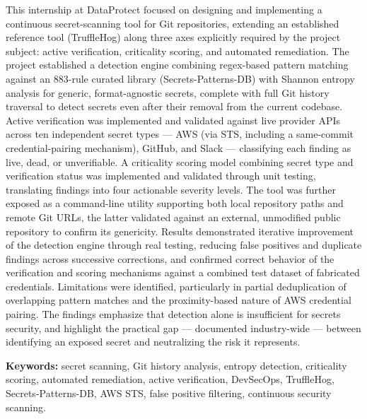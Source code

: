 \documentclass[12pt]{article}
\begin{document}
This internship at DataProtect focused on designing and implementing a
continuous secret-scanning tool for Git repositories, extending an established
reference tool (TruffleHog) along three axes explicitly required by the project
subject: active verification, criticality scoring, and automated remediation.
The project established a detection engine combining regex-based pattern
matching against an 883-rule curated library (Secrets-Patterns-DB) with Shannon
entropy analysis for generic, format-agnostic secrets, complete with full Git
history traversal to detect secrets even after their removal from the current
codebase. Active verification was implemented and validated against live
provider APIs across ten independent secret types --- AWS (via STS, including
a same-commit credential-pairing mechanism), GitHub, and Slack --- classifying
each finding as live, dead, or unverifiable. A criticality scoring model
combining secret type and verification status was implemented and validated
through unit testing, translating findings into four actionable severity
levels. The tool was further exposed as a command-line utility supporting both
local repository paths and remote Git URLs, the latter validated against an
external, unmodified public repository to confirm its genericity. Results
demonstrated iterative improvement of the detection engine through real
testing, reducing false positives and duplicate findings across successive
corrections, and confirmed correct behavior of the verification and scoring
mechanisms against a combined test dataset of fabricated credentials.
Limitations were identified, particularly in partial deduplication of
overlapping pattern matches and the proximity-based nature of AWS credential
pairing. The findings emphasize that detection alone is insufficient for
secrets security, and highlight the practical gap --- documented industry-wide
--- between identifying an exposed secret and neutralizing the risk it
represents.

\textbf{Keywords:} secret scanning, Git history analysis, entropy detection,
criticality scoring, automated remediation, active verification, DevSecOps,
TruffleHog, Secrets-Patterns-DB, AWS STS, false positive filtering, continuous
security scanning.

\newpage

\listoffigures
{}
\newpage
\listoftables
{}
\newpage
\end{document}
